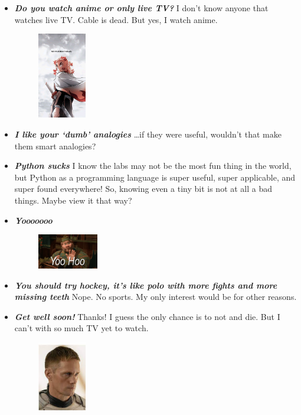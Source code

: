 \documentclass[11pt,letterpaper]{article}
\begin{document}
\begin{itemize}
\item {\bfseries\itshape Do you watch anime or only live TV?} I don't know anyone that watches live TV. Cable is dead. But yes, I watch anime. 
	\begin{figure}[H]
	\centering
	\includegraphics[width=0.2\textwidth]{images/ablaze.jpg}
	\end{figure}

\item {\bfseries\itshape I like your `dumb' analogies} \dots if they were useful, wouldn't that make them smart analogies?

\item {\bfseries\itshape Python sucks} I know the labs may not be the most fun thing in the world, but Python as a programming language is super useful, super applicable, and super found everywhere! So, knowing even a tiny bit is not at all a bad things. Maybe view it that way?

\item {\bfseries\itshape Yooooooo} 
	\begin{figure}[H]
	\centering
	\includegraphics[width=0.25\textwidth]{images/yoohoo.png}
	\end{figure}

\item {\bfseries\itshape You should try hockey, it's like polo with more fights and more missing teeth} Nope. No sports. My only interest would be for other reasons. 

\item {\bfseries\itshape Get well soon!} Thanks! I guess the only chance is to not and die. But I can't with so much TV yet to watch. 
	\begin{figure}[H]
	\centering
	\includegraphics[width=0.2\textwidth]{images/murderbot.jpeg}
	\end{figure}


\end{itemize}
\end{document}
